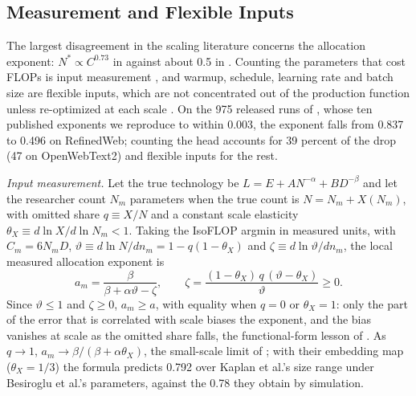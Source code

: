 

\subsection{Measurement and Flexible Inputs}\label{app:add-measurement}



The largest disagreement in the scaling literature concerns the allocation exponent: $N^*\propto C^{0.73}$ in
\citet{kaplan2020scaling} against about 0.5 in \citet{hoffmann2022training}. Counting the parameters that cost FLOPs is input
measurement \citep{collardwexler2016production}, and warmup, schedule, learning rate and batch size are flexible inputs,
which are not concentrated out of the production function unless re-optimized at each scale
\citep{ackerberg2015identification,gandhi2020identification}. On the 975 released runs of \citet{porian2024resolving}, whose
ten published exponents we reproduce to within 0.003, the exponent falls from 0.837 to 0.496 on RefinedWeb; counting the
head accounts for 39 percent of the drop (47 on OpenWebText2) and flexible inputs for the rest.

\textit{Input measurement.}\label{app:add-biasformulas} Let the true technology be $L=E+AN^{-\alpha}+BD^{-\beta}$ and let
the researcher count $N_m$ parameters when the true count is $N=N_m+X(N_m)$, with omitted share $q\equiv X/N$ and a constant
scale elasticity $\theta_X\equiv d\ln X/d\ln N_m<1$. Taking the IsoFLOP argmin in measured units, with $C_m=6N_mD$,
$\vartheta\equiv d\ln N/dn_m=1-q(1-\theta_X)$ and $\zeta\equiv d\ln\vartheta/dn_m$, the local measured allocation exponent is
\begin{equation}\label{eq:app-measbias}
a_m=\frac{\beta}{\beta+\alpha\vartheta-\zeta},\qquad
\zeta=\frac{(1-\theta_X)\,q\,(\vartheta-\theta_X)}{\vartheta}\ge0 .
\end{equation}
Since $\vartheta\le1$ and $\zeta\ge0$, $a_m\ge a$, with equality when $q=0$ or $\theta_X=1$: only the part of the error
that is correlated with scale biases the exponent, and the bias vanishes at scale as the omitted share falls, the
functional-form lesson of \citet{nerlove1963returns}. As $q\to1$, $a_m\to\beta/(\beta+\alpha\theta_X)$, the small-scale limit
of \citet{pearce2024reconciling}; with their embedding map ($\theta_X=1/3$) the formula predicts 0.792 over Kaplan et al.'s
size range under Besiroglu et al.'s parameters, against the 0.78 they obtain by simulation.


